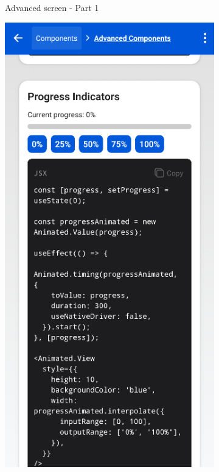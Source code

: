\begin{enumerate}
\begin{itemize}
\begin{figure}[ht]
\begin{subfigure}[b]{0.48\textwidth}
                \caption{Advanced screen - Part 1}
                \label{fig:advanced-left1}
            \end{subfigure}
            \hfill
            \begin{subfigure}[b]{0.48\textwidth}
                \centering
                \includegraphics[width=\linewidth, alt={Second part of the Advanced screen}]{img/advanced2.png}

\end{subfigure}
\end{figure}
\end{itemize}
\end{enumerate}

